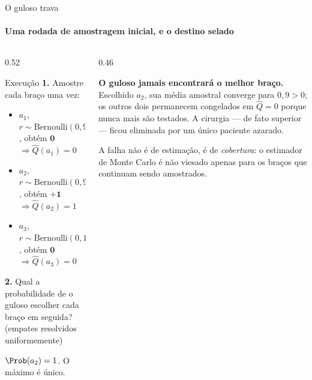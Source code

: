 \documentclass[aspectratio=169, 10pt]{beamer}
\newcommand{\Qhat}{\widehat{Q}}
\newcommand{\Ber}{\mathrm{Bernoulli}}
\begin{document}
\begin{frame}{O guloso trava}
  \framesubtitle{Uma rodada de amostragem inicial, e o destino selado}

  \begin{columns}[T]
    \begin{column}{0.52\textwidth}
      \begin{algbox}{Execução}
        \textbf{1.} Amostre cada braço uma vez:
        \begin{itemize}\setlength{\itemsep}{0.1ex}\small
          \item $a_1$, $r \sim \Ber(0{,}95)$, obtém $\mathbf{0}$
                $\Rightarrow \Qhat(a_1) = 0$
          \item $a_2$, $r \sim \Ber(0{,}90)$, obtém $\mathbf{+1}$
                $\Rightarrow \Qhat(a_2) = 1$
          \item $a_3$, $r \sim \Ber(0{,}10)$, obtém $\mathbf{0}$
                $\Rightarrow \Qhat(a_3) = 0$
        \end{itemize}
        \textbf{2.} Qual a probabilidade de o guloso escolher cada braço
        em seguida? (empates resolvidos uniformemente)
      \end{algbox}
      \pause
      \begin{respbox}
        $\Prob(a_2) = 1$. O máximo é único.
      \end{respbox}
    \end{column}
    \begin{column}{0.46\textwidth}
      \pause
      \begin{alertabox}
        \textbf{O guloso jamais encontrará o melhor braço.} Escolhido
        $a_2$, sua média amostral converge para $0{,}9 > 0$; os outros dois
        permanecem congelados em $\Qhat = 0$ porque nunca mais são
        testados. A cirurgia --- de fato superior --- ficou eliminada por
        um único paciente azarado.
      \end{alertabox}
      \begin{ideiabox}
        A falha não é de estimação, é de \emph{cobertura}: o estimador de
        Monte Carlo é não viesado apenas para os braços que continuam
        sendo amostrados.
      \end{ideiabox}
    \end{column}
  \end{columns}
\end{frame}

\end{document}
